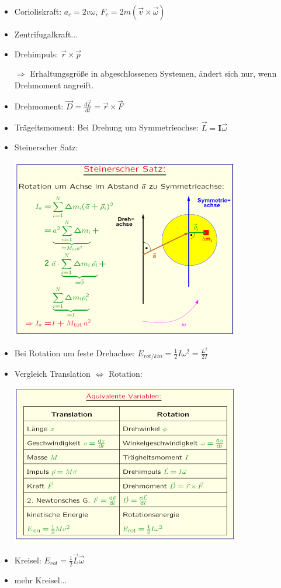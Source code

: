 \documentclass[a4paper,10pt, fleqn]{article}
\begin{document}
\begin{itemize}
\item Corioliskraft: $a_c = 2v\omega$, $F_c = 2m (\vec{v} \times \vec{\omega})$
\item Zentrifugalkraft...
\item Drehimpuls: $\vec{r} \times \vec{p}$

  $\Rightarrow$ Erhaltungsgröße in abgeschlossenen Systemen, ändert sich nur, wenn Drehmoment angreift.
\item Drehmoment: $\vec{D} = \frac{d\vec{L}}{dt} = \vec{r} \times \vec{F}$
\item Trägeitsmoment: Bei Drehung um Symmetrieachse: $\vec{L} = \mathbf{I}\vec{\omega}$
\item Steinerscher Satz:

  \includegraphics[width=10cm]{SteinerscherSatz}
\item Bei Rotation um feste Drehachse: $E_{rot/kin} = \frac{1}{2}I\omega^2 = \frac{L^2}{2I}$
\item Vergleich Translation $\Leftrightarrow$ Rotation:

  \includegraphics[width=10cm]{TranslationVsRotation}
\item Kreisel: $E_{rot} = \frac{1}{2}\vec{L}\vec{\omega}$
\item mehr Kreisel...
\end{itemize}
\end{document}
